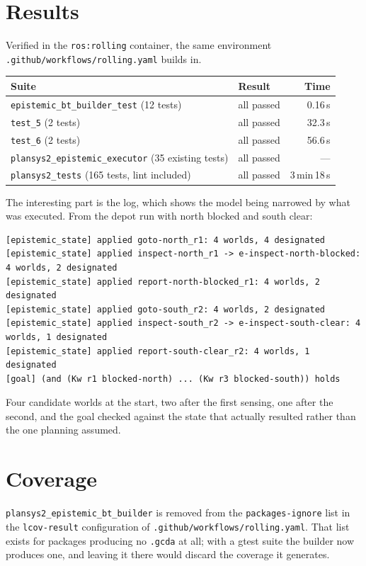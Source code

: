 \documentclass[11pt,a4paper]{article}
\newcommand{\code}[1]{\texttt{\small #1}}
\begin{document}
\section{Results}

Verified in the \code{ros:rolling} container, the same environment
\code{.github/workflows/rolling.yaml} builds in.

\begin{center}
\begin{tabular}{llr}
\toprule
Suite & Result & Time \\
\midrule
\code{epistemic\_bt\_builder\_test} (12 tests) & all passed & 0.16\,s \\
\code{test\_5} (2 tests) & all passed & 32.3\,s \\
\code{test\_6} (2 tests) & all passed & 56.6\,s \\
\code{plansys2\_epistemic\_executor} (35 existing tests) & all passed & --- \\
\code{plansys2\_tests} (165 tests, lint included) & all passed & 3\,min\,18\,s \\
\bottomrule
\end{tabular}
\end{center}

The interesting part is the log, which shows the model being narrowed by what
was executed. From the depot run with north blocked and south clear:

\begin{lstlisting}
[epistemic_state] applied goto-north_r1: 4 worlds, 4 designated
[epistemic_state] applied inspect-north_r1 -> e-inspect-north-blocked: 4 worlds, 2 designated
[epistemic_state] applied report-north-blocked_r1: 4 worlds, 2 designated
[epistemic_state] applied goto-south_r2: 4 worlds, 2 designated
[epistemic_state] applied inspect-south_r2 -> e-inspect-south-clear: 4 worlds, 1 designated
[epistemic_state] applied report-south-clear_r2: 4 worlds, 1 designated
[goal] (and (Kw r1 blocked-north) ... (Kw r3 blocked-south)) holds
\end{lstlisting}

Four candidate worlds at the start, two after the first sensing, one after the
second, and the goal checked against the state that actually resulted rather
than the one planning assumed.

\section{Coverage}

\code{plansys2\_epistemic\_bt\_builder} is removed from the
\code{packages-ignore} list in the \code{lcov-result} configuration of
\code{.github/workflows/rolling.yaml}. That list exists for packages producing
no \code{.gcda} at all; with a gtest suite the builder now produces one, and
leaving it there would discard the coverage it generates.
\end{document}
